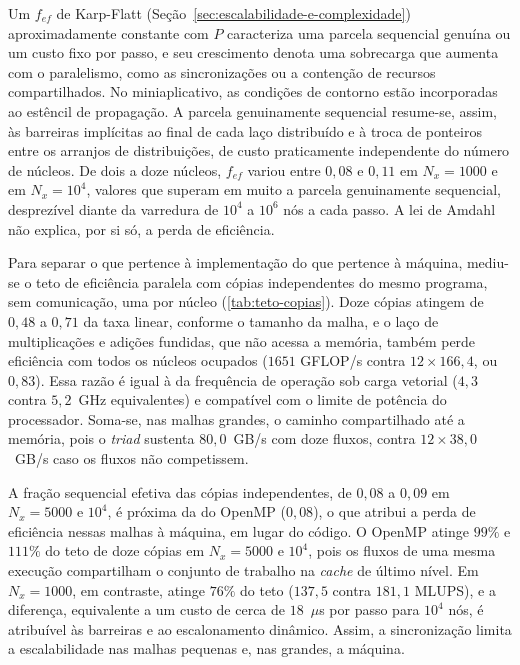 Um \(f_{ef}\) de Karp-Flatt (Seção~\ref{sec:escalabilidade-e-complexidade}) aproximadamente constante com \(P\) caracteriza uma parcela sequencial genuína ou um custo fixo por passo, e seu crescimento denota uma sobrecarga que aumenta com o paralelismo, como as sincronizações ou a contenção de recursos compartilhados.
No miniaplicativo, as condições de contorno estão incorporadas ao estêncil de propagação.
A parcela genuinamente sequencial resume-se, assim, às barreiras implícitas ao final de cada laço distribuído e à troca de ponteiros entre os arranjos de distribuições, de custo praticamente independente do número de núcleos.
De dois a doze núcleos, \(f_{ef}\) variou entre \(0{,}08\) e \(0{,}11\) em \(N_x = 1000\) e em \(N_x = 10^4\), valores que superam em muito a parcela genuinamente sequencial, desprezível diante da varredura de \(10^{4}\) a \(10^{6}\) nós a cada passo.
A lei de Amdahl não explica, por si só, a perda de eficiência.

Para separar o que pertence à implementação do que pertence à máquina, mediu-se o teto de eficiência paralela com cópias independentes do mesmo programa, sem comunicação, uma por núcleo (\autoref{tab:teto-copias}).
Doze cópias atingem de \(0{,}48\) a \(0{,}71\) da taxa linear, conforme o tamanho da malha, e o laço de multiplicações e adições fundidas, que não acessa a memória, também perde eficiência com todos os núcleos ocupados (\(1651\) GFLOP/s contra \(12 \times 166{,}4\), ou \(0{,}83\)).
Essa razão é igual à da frequência de operação sob carga vetorial (\(4{,}3\) contra \(5{,}2\)~GHz equivalentes) e compatível com o limite de potência do processador.
Soma-se, nas malhas grandes, o caminho compartilhado até a memória, pois o \textit{triad} sustenta \(80{,}0\)~GB/s com doze fluxos, contra \(12 \times 38{,}0\)~GB/s caso os fluxos não competissem.

A fração sequencial efetiva das cópias independentes, de \(0{,}08\) a \(0{,}09\) em \(N_x = 5000\) e \(10^4\), é próxima da do OpenMP (\(0{,}08\)), o que atribui a perda de eficiência nessas malhas à máquina, em lugar do código.
O OpenMP atinge \(99\%\) e \(111\%\) do teto de doze cópias em \(N_x = 5000\) e \(10^4\), pois os fluxos de uma mesma execução compartilham o conjunto de trabalho na \textit{cache} de último nível.
Em \(N_x = 1000\), em contraste, atinge \(76\%\) do teto (\(137{,}5\) contra \(181{,}1\) MLUPS), e a diferença, equivalente a um custo de cerca de \(18\)~\(\mu\)s por passo para \(10^4\) nós, é atribuível às barreiras e ao escalonamento dinâmico.
Assim, a sincronização limita a escalabilidade nas malhas pequenas e, nas grandes, a máquina.

